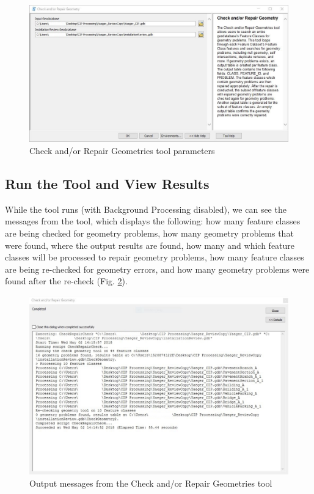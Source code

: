 \documentclass[openany]{book}
\theoremstyle{definition}
\theoremstyle{definition}
\theoremstyle{definition}
\theoremstyle{remark}
\begin{document}
\begin{figure}[H]

{\centering \includegraphics[width=5.18in,]{figures/chkG-params} 

}

\caption{Check and/or Repair Geometries tool parameters}\label{fig:chkGparams}
\end{figure}

\subsection{Run the Tool and View
Results}\label{run-the-tool-and-view-results-5}

While the tool runs (with Background Processing disabled), we can see
the messages from the tool, which displays the following: how many
feature classes are being checked for geometry problems, how many
geometry problems that were found, where the output results are found,
how many and which feature classes will be processed to repair geometry
problems, how many feature classes are being re-checked for geometry
errors, and how many geometry problems were found after the re-check
(Fig. \ref{fig:chkGmessages}).

\begin{figure}[H]

{\centering \includegraphics[width=5.07in,]{figures/chkG-messages} 

}

\caption{Output messages from the Check and/or Repair Geometries tool}\label{fig:chkGmessages}
\end{figure}
\end{document}
